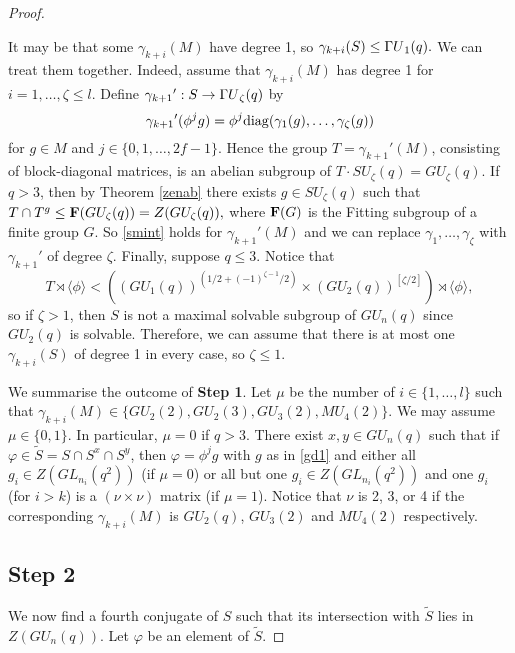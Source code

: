\begin{proof}
\begin{Rem}%
\label{remni1}
It may  be  that some  $\gamma_{k+i}(M)$ have degree 1, so $\gamma_{k+i}(S) \le {{\Gamma U}}_1(q).$ %
We can treat them together. Indeed, assume that $\gamma_{k+i}(M)$ has degree 1 for $i=1, \ldots, \zeta \le l$. Define $\gamma_{k+1}{'} : S \to {{\Gamma U}}_{\zeta}(q)$ by 
$$\gamma_{k+1}{'}(\phi^j g)= \phi^j \mathrm{diag}(\gamma_1(g), \ldots, \gamma_{\zeta}(g))$$ for  $g \in M$ and $j \in \{0,1, \ldots, 2f-1\}.$
 Hence the group $T=\gamma_{k+1}{'}(M)$, consisting of block-diagonal matrices, 
is an abelian subgroup of $T \cdot SU_{\zeta}(q)=GU_{\zeta}(q).$ If $q>3$, then by Theorem \ref{zenab} there exists $g \in SU_{\zeta}(q)$ such that 
$T \cap T^g\le {\bf F}(GU_{\zeta}(q))=Z(GU_{\zeta}(q)),$ where ${\bf F}(G)$ is the Fitting subgroup of a finite group $G$. So \eqref{smint} holds for $\gamma_{k+1}{'}(M)$ and  we can replace $\gamma_1, \ldots, \gamma_{\zeta}$ with 
$\gamma_{k+1}{'}$ of degree $\zeta$. 
Finally, suppose $q \le 3$. Notice that $$T \rtimes \langle \phi \rangle < ((GU_1(q))^{(1/2 +(-1)^{{\zeta}-1}/2)} \times (GU_2(q))^{[{\zeta}/2]}) \rtimes \langle \phi \rangle,$$ so if ${\zeta}>1$, then $S$ is not a maximal solvable subgroup of $GU_n(q)$ since $GU_2(q)$ is solvable.
 Therefore, we can assume that there is at most one $\gamma_{k+i}(S)$ of degree 1 in every case, so ${\zeta} \le 1.$
\end{Rem}

\bigskip

 We summarise the outcome of {\bf Step 1}. Let $\mu$ be the number of $i \in \{1, \ldots, l\}$ such that $\gamma_{k+i}(M) \in \{GU_2(2), GU_2(3), GU_3(2), MU_4(2)\}.$  We may assume $\mu \in \{0,1\}.$ In particular, $\mu=0$ if $q>3.$  There exist $x,y \in GU_n(q)$ such that if $\varphi \in \tilde{S}=S\cap S^x \cap S^y$, then    $\varphi =\phi^j g$ with $g$ as in \eqref{gd1} and either all $g_i \in Z(GL_{n_i}(q^2))$ (if $\mu=0$) or  all but one  $g_i \in Z(GL_{n_i}(q^2))$ and one $g_i$ (for $i>k$) is a 
$(\nu \times \nu)$ matrix (if $\mu=1$). Notice that $\nu$ is 2, 3, or 4 if the corresponding $\gamma_{k+i}(M)$ is $GU_2(q)$,  $GU_3(2)$ and  $MU_4(2)$ respectively. 



 
\subsection*{Step 2} We now find a fourth conjugate of $S$ such that its intersection with $\tilde{S}$ lies in  $Z(GU_n(q)).$ Let $\varphi$ be an element of $\tilde{S}.$



\end{proof}
